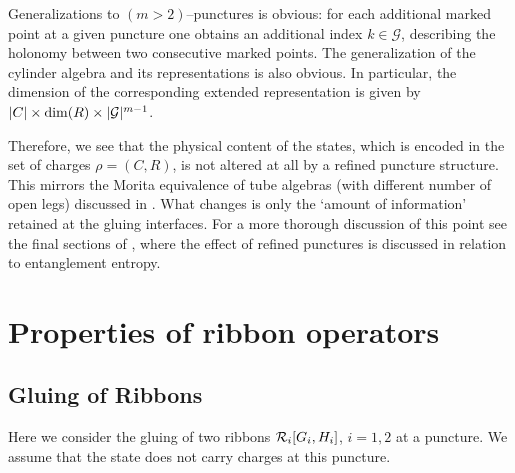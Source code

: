 \documentclass[nofootinbib,superscriptaddress,eqsecnum,tightenlines,11pt]{revtex4-1}
\def\mG{\mathcal{G}}
\begin{document}
Generalizations to $(m>2)$--punctures is obvious: for each additional marked point at a given puncture one obtains an additional index $k \in \mG$, describing the holonomy between two consecutive marked points. The generalization of the cylinder algebra and its representations is also obvious. In particular, the dimension of the corresponding extended representation is given by $|C|\times \dim(R) \times |{\cal G}|^{m-1}$. 

Therefore, we see that the physical content of the states, which is encoded in the set of charges $\rho=(C,R)$, is not altered at all by a refined puncture structure. This mirrors the Morita equivalence of tube algebras (with different number of open legs) discussed in \cite{Lan}. What changes is only the `amount of information' retained at the gluing interfaces. For a more thorough discussion of this point see the final sections of \cite{Toappear}, where the effect of refined punctures is discussed in relation to entanglement entropy.




\section{Properties of ribbon operators}

\subsection{Gluing of Ribbons} \label{gluingribbons}


Here we consider the gluing of two ribbons ${\cal R}_i[G_i,H_i]$, $i=1,2$ at a puncture. We assume that the state does not carry charges at this puncture.
\end{document}
